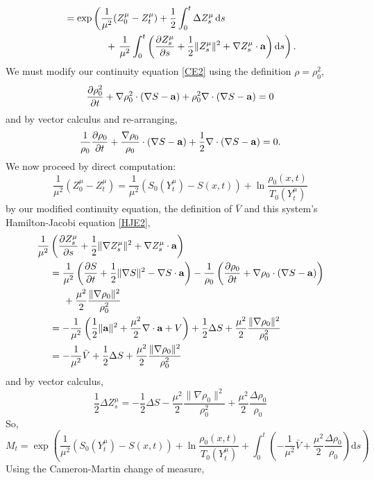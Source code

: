 \documentclass[a4paper,12pt,draft]{report}
\theoremstyle{remark}
\theoremstyle{definition}
\begin{document}
{\begin{align}
& = \exp\left(\frac{1}{\mu^2}(Z_0^\mu - Z_t^\mu) + \frac{1}{2}\int_0^t\Delta Z_s^\mu\,\mathrm{d}s\right.\nonumber\\
& \hspace{1.5cm} + \left.\frac{1}{\mu^2}\int_0^t\left(\frac{\partial Z_s^\mu}{\partial s} + \frac{1}{2}\|Z_s^\mu\|^2 + \nabla Z_s^\mu\cdot\bold{a}\right)\mathrm{d}s\right).\nonumber
\end{align}
We must modify our continuity equation \eqref{CE2} using the definition $\rho = \rho_0^2$,
$$
\frac{\partial\rho_0^2}{\partial t} + \nabla\rho_0^2\cdot(\nabla S - \bold{a}) + \rho_0^2\nabla\cdot(\nabla S - \bold{a}) = 0
$$
and by vector calculus and re-arranging,
$$
\frac{1}{\rho_0}\frac{\partial\rho_0}{\partial t} + \frac{\nabla\rho_0}{\rho_0}\cdot(\nabla S - \bold{a}) + \frac{1}{2}\nabla\cdot(\nabla S - \bold{a}) = 0.
$$
We now proceed by direct computation:
$$
\frac{1}{\mu^2}(Z_0^\mu - Z_t^\mu) = \frac{1}{\mu^2}(S_0(Y_t^\mu) - S(x, t)) + \ln\frac{\rho_0(x, t)}{T_0(Y_t^\mu)}
$$
by our modified continuity equation, the definition of $\bar{V}$ and this system's Hamilton-Jacobi equation \eqref{HJE2},
\begin{align}
\frac{1}{\mu^2}&\left(\frac{\partial Z_s^\mu}{\partial s} + \frac{1}{2}\|\nabla Z_s^\mu\|^2 + \nabla Z_s^\mu\cdot\bold{a}\right)\nonumber\\
& = \frac{1}{\mu^2}\left(\frac{\partial S}{\partial t} + \frac{1}{2}\|\nabla S\|^2 - \nabla S\cdot\bold{a}\right) - \frac{1}{\rho_0}\left(\frac{\partial\rho_0}{\partial t} + \nabla\rho_0\cdot(\nabla S - \bold{a})\right)\nonumber\\
& \hspace{0.5cm} + \frac{\mu^2}{2}\frac{\|\nabla\rho_0\|^2}{\rho_0^2}\nonumber\\
& = -\frac{1}{\mu^2}\left(\frac{1}{2}\|\bold{a}\|^2 + \frac{\mu^2}{2}\nabla\cdot\bold{a} + V\right) + \frac{1}{2}\Delta S + \frac{\mu^2}{2}\frac{\|\nabla\rho_0\|^2}{\rho_0^2}\nonumber\\
& = -\frac{1}{\mu^2}\bar{V} + \frac{1}{2}\Delta S + \frac{\mu^2}{2}\frac{\|\nabla\rho_0\|^2}{\rho_0^2}\nonumber
\end{align}
and by vector calculus,
$$
\frac{1}{2}\Delta Z_s^\mu = -\frac{1}{2}\Delta S - \frac{\mu^2}{2}\frac{\|\nabla\rho_0\|^2}{\rho_0^2} + \frac{\mu^2}{2}\frac{\Delta\rho_0}{\rho_0}
$$
So,
$$
M_t = \exp\left(\frac{1}{\mu^2}(S_0(Y_t^\mu) - S(x, t)) + \ln\frac{\rho_0(x, t)}{T_0(Y_t^\mu)} + \int_0^t\left(-\frac{1}{\mu^2}\bar{V} + \frac{\mu^2}{2}\frac{\Delta\rho_0}{\rho_0}\right)\mathrm{d}s\right)\nonumber
$$
Using the Cameron-Martin change of measure,
}
\end{document}
